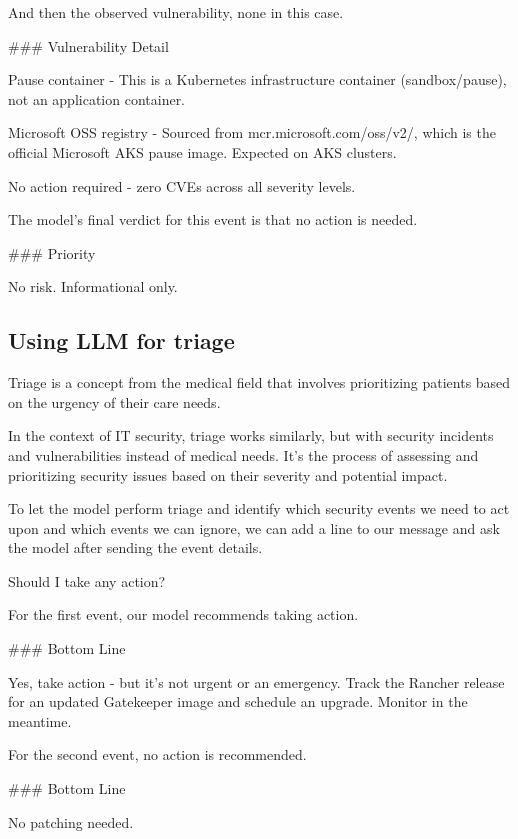 And then the observed vulnerability, none in this case.

\indent\colorbox{codegrey}{
    \parbox{0.8\linewidth}{
\#\#\# Vulnerability Detail

Pause container - This is a Kubernetes infrastructure container (sandbox/pause), not an application container.

Microsoft OSS registry - Sourced from mcr.microsoft.com/oss/v2/, which is the official Microsoft AKS pause image. Expected on AKS clusters.

No action required - zero CVEs across all severity levels.
    }
}

The model's final verdict for this event is that no action is needed.

\indent\colorbox{codegrey}{
    \parbox{0.8\linewidth}{
\#\#\# Priority

No risk. Informational only.
    }
}

\subsection{Using LLM for triage}

Triage is a concept from the medical field that involves prioritizing patients based on the urgency of their care needs.

In the context of IT security, triage works similarly, but with security incidents and vulnerabilities instead of medical needs. It's the process of assessing and prioritizing security issues based on their severity and potential impact.

To let the model perform triage and identify which security events we need to act upon and which events we can ignore, we can add a line to our message and ask the model after sending the event details.

\indent\colorbox{codegrey}{
    \parbox{0.8\linewidth}{
Should I take any action?
     }
}

For the first event, our model recommends taking action.

\indent\colorbox{codegrey}{
    \parbox{0.8\linewidth}{
\#\#\# Bottom Line

Yes, take action - but it's not urgent or an emergency. Track the Rancher release for an updated Gatekeeper image and schedule an upgrade. Monitor in the meantime.
     }
}

For the second event, no action is recommended.

\indent\colorbox{codegrey}{
    \parbox{0.8\linewidth}{
\#\#\# Bottom Line

No patching needed.
    }
}

